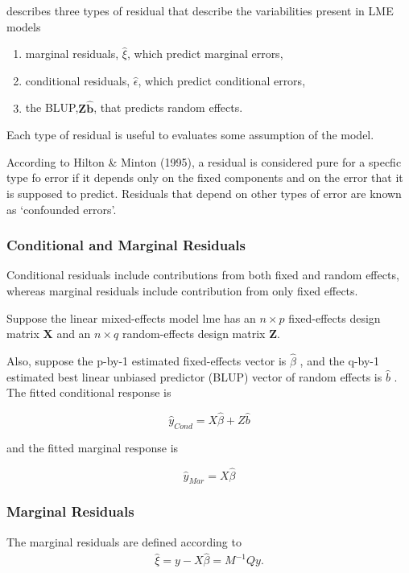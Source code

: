 \documentclass[12pt, a4paper]{report}
\theoremstyle{plain}
\theoremstyle{definition}
\theoremstyle{remark}
\begin{document}
	
\citet{pb} describes three types of residual that describe the variabilities
	present in LME models
	\begin{enumerate}
		\item marginal residuals, $\hat{\xi}$, which predict marginal errors,
		\item conditional residuals, $\hat{\epsilon}$, which predict conditional errors,
		\item the BLUP,$\boldsymbol{Z\hat{b}}$, that predicts random effects.
	\end{enumerate}
	Each type of residual is useful to evaluates some assumption of the model.
	
	
	According to Hilton \& Minton (1995), a residual is considered pure for a specfic type fo error
	if it depends only on the fixed components and on the error that it is supposed to predict.
	Residuals that depend on other types of error are known as `confounded errors'.
	
	
	
	
	\subsubsection{Conditional and Marginal Residuals}
	Conditional residuals include contributions from both fixed and random effects, whereas marginal residuals include contribution from only fixed effects.
	
	Suppose the linear mixed-effects model lme has an $n \times p$ fixed-effects design matrix $\boldsymbol{X}$ and an $n \times q$ random-effects design matrix $\boldsymbol{Z}$. 
	
	Also, suppose the p-by-1 estimated fixed-effects vector is $\hat{\beta}$ , and the q-by-1 estimated best linear unbiased predictor (BLUP) 
	vector of random effects is $\hat{b}$ . The fitted conditional response is
	
	\[ \hat{y}_{Cond} = X \hat{\beta} + Z \hat{b} \]
	
	and the fitted marginal response is
	
	
	\[ \hat{y}_{Mar} = X \hat{\beta} \]
	
	\subsubsection{Marginal Residuals}
	The marginal residuals are defined according to
	\begin{eqnarray*}
		\hat{\xi} = y - X\hat{\beta} = M^{-1}Qy. \\\nonumber
	\end{eqnarray*}
	
\end{document}
